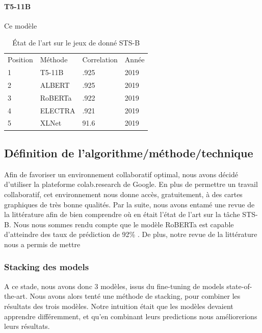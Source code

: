 \documentclass[11pt,a4paper, french]{article}
\begin{document}
\paragraph{T5-11B} Ce modèle


	\begin{table}[]
		\begin{tabular}{llll}
			\hline
			Position & Méthode & Correlation & Année \\
			1        & T5-11B  & .925                 & 2019  \\
			2        & ALBERT  & .925                 & 2019  \\
			3        & RoBERTa & .922                 & 2019  \\
			4        & ELECTRA & .921                 & 2019  \\
			5        & XLNet   & 91.6                 & 2019 
		\end{tabular}
	  \caption{État de l'art sur le jeux de donné STS-B}
	\end{table}



\subsection{Définition de l'algorithme/méthode/technique}

Afin de favoriser un environnement collaboratif optimal, nous avons décidé d’utiliser la plateforme colab.research de Google. En plus de permettre un travail collaboratif, cet environnement nous donne accès, gratuitement, à des cartes graphiques de très bonne qualités. Par la suite, nous avons entamé une revue de la littérature afin de bien comprendre où en était l’état de l’art sur la tâche STS-B. Nous nous sommes rendu compte que le modèle RoBERTa est capable d’atteindre des taux de prédiction de 92\% \cite{RoBERTa}. De plus, notre revue de la littérature nous a permis de mettre 


\subsubsection{Stacking des models}

A ce stade, nous avons donc 3 modèles, issus du fine-tuning de models state-of-the-art. Nous avons alors tenté une méthode de stacking, pour combiner les résultats des trois modèles. Notre intuition était que les modèles devaient apprendre différemment, et qu'en combinant leurs predictions nous améliorerions leurs résultats.
\end{document}
